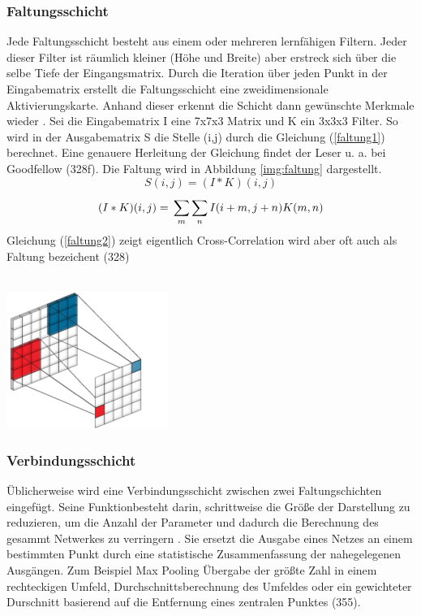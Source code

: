 \documentclass[twosided,a4,10pt]{article}
\begin{document}
\begin{multicols}{2}
\subsubsection*{Faltungsschicht}
Jede Faltungsschicht besteht aus einem oder mehreren lernfähigen Filtern. Jeder dieser Filter ist räumlich kleiner (Höhe und Breite) aber erstreck sich über die selbe Tiefe der Eingangsmatrix. Durch die Iteration über jeden Punkt in der Eingabematrix erstellt die Faltungsschicht eine zweidimensionale Aktivierungskarte. Anhand dieser erkennt die Schicht dann gewünschte Merkmale wieder \cite{karpathy}.\newline
Sei die Eingabematrix I eine 7x7x3 Matrix und K ein 3x3x3 Filter. So wird in der Ausgabematrix S die Stelle (i,j) durch die Gleichung (\ref{faltung1})  berechnet. Eine genauere Herleitung der Gleichung findet der Leser u. a. bei Goodfellow \cite{goodfellow}(328f). Die Faltung wird in Abbildung \ref{img:faltung} dargestellt.
\begin{equation}\label{faltung1}
S(i,j) =(I*K)(i,j)
\end{equation}
\begin{equation}\label{faltung2}
(I*K)(i,j) =\newline\sum_{m}^{}\sum_{n}^{}I(i+m,j+n)K(m,n)
\end{equation}
Gleichung (\ref{faltung2}) zeigt eigentlich Cross-Correlation wird aber oft auch als Faltung bezeichent \cite{goodfellow}(328)\\
\\
\begin{minipage}{0.45\textwidth}
	\centering
	\includegraphics{img/faltung-klein.png}
	\label{img:faltung}
\end{minipage}

\subsubsection*{Verbindungsschicht}
Üblicherweise wird eine Verbindungsschicht zwischen zwei Faltungschichten eingefügt. Seine Funktionbesteht darin, schrittweise die Größe der Darstellung zu reduzieren, um die Anzahl der Parameter und dadurch die Berechnung des gesammt Netwerkes zu verringern \cite{karpathy}. Sie ersetzt die Ausgabe eines Netzes an einem bestimmten Punkt durch eine statistische Zusammenfassung der nahegelegenen Ausgängen. Zum Beispiel Max Pooling \cite{zhou} Übergabe der größte Zahl in einem rechteckigen Umfeld, Durchschnittsberechnung des Umfeldes oder ein gewichteter Durschnitt basierend auf die Entfernung eines zentralen Punktes \cite{goodfellow}(355).


\end{multicols}
\end{document}
